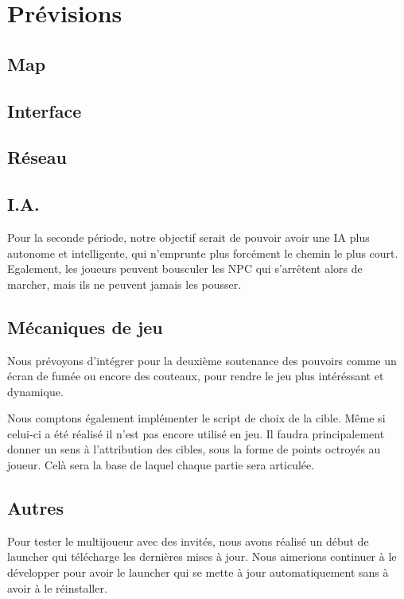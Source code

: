 \section{Prévisions}

\subsection{Map}

\subsection{Interface}

\subsection{Réseau}

\subsection{I.A.}
    Pour la seconde période, notre objectif serait de pouvoir avoir une IA plus autonome et intelligente, qui n'emprunte plus forcément le chemin le plus court.
    Egalement, les joueurs peuvent bousculer les NPC qui s'arrêtent alors de marcher, mais ils ne peuvent jamais les pousser.

\subsection{Mécaniques de jeu}
    Nous prévoyons d'intégrer pour la deuxième soutenance des pouvoirs
    comme un écran de fumée ou encore des couteaux,
    pour rendre le jeu plus intéréssant et dynamique.

    Nous comptons également implémenter le script de choix de la cible. Même si celui-ci a été réalisé il n'est pas encore utilisé en jeu. Il faudra principalement donner un sens à l'attribution des cibles, sous la forme de points octroyés au joueur. Celà sera la base de laquel chaque partie sera articulée.

\subsection{Autres}
    Pour tester le multijoueur avec des invités, nous avons réalisé 
    un début de launcher qui télécharge les dernières mises à jour.
    Nous aimerions continuer à le développer pour avoir le launcher
    qui se mette à jour automatiquement sans à avoir à le réinstaller.
